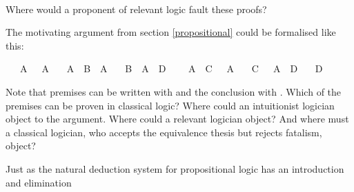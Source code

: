 \begin{isabellebody}
\ %
\endisadelimproof
%
\isatagproof
{}\isamarkupfalse%
%
\endisatagproof
{\isafoldproof}%
%
\isadelimproof
%
\endisadelimproof
%
\begin{isamarkuptext}%
Where would a proponent of relevant logic fault these proofs?%
\end{isamarkuptext}\isamarkuptrue%
%
\begin{isamarkuptext}%
\begin{Exercise}[title = The Air Raid] The motivating argument from section \ref{propositional} could be formalised like this: \end{Exercise}%
\end{isamarkuptext}\isamarkuptrue%
\isamarkupfalse%
\isanewline
\ \ \ {\isachardoublequoteopen}A\ {\isasymor}\ {\isasymnot}\ A{\isachardoublequoteclose}\isanewline
\ \ \ {\isachardoublequoteopen}A\ {\isasymlongrightarrow}\ B\ {\isasymlongrightarrow}\ A{\isachardoublequoteclose}\isanewline
\ \ \ {\isachardoublequoteopen}{\isacharparenleft}B\ {\isasymlongrightarrow}\ A{\isacharparenright}\ {\isasymlongrightarrow}\ D{\isachardoublequoteclose}\isanewline
\ \ \ {\isachardoublequoteopen}{\isasymnot}\ A\ {\isasymlongrightarrow}\ C\ {\isasymlongrightarrow}\ {\isasymnot}\ A{\isachardoublequoteclose}\isanewline
\ \ \ {\isachardoublequoteopen}{\isacharparenleft}C\ {\isasymlongrightarrow}\ {\isasymnot}\ A{\isacharparenright}\ {\isasymlongrightarrow}\ D{\isachardoublequoteclose}\isanewline
\ \ \ {\isachardoublequoteopen}D{\isachardoublequoteclose}%
\isadelimproof
\ %
\endisadelimproof
%
\isatagproof
{}\isamarkupfalse%
%
\endisatagproof
{\isafoldproof}%
%
\isadelimproof
%
\endisadelimproof
%
\begin{isamarkuptext}%
Note that premises can be written with  and the conclusion with .
Which of the premises can be proven in classical logic? Where could an intuitionist logician object to
the argument. Where could a relevant logician object? And where must a classical logician, who accepts
the equivalence thesis but rejects fatalism, object?%
\end{isamarkuptext}\isamarkuptrue%
%
\isadelimdocument
%
\endisadelimdocument
%
\isatagdocument
%
\isamarkuptrue%
%
\endisatagdocument
{\isafolddocument}%
%
\isadelimdocument
%
\endisadelimdocument
%
\begin{isamarkuptext}%
Just as the natural deduction system for propositional logic has an introduction and elimination 

\end{isamarkuptext}
\end{isabellebody}

